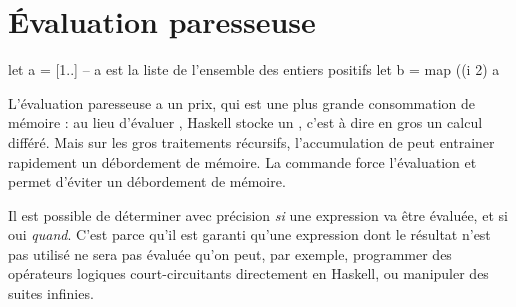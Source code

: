 \section{Évaluation paresseuse}
\label{lazyness}

\begin{haskellcode}
let a = [1..] -- a est la liste de l'ensemble des entiers positifs
let b = map ((^^) 2) a
\end{haskellcode}

L'évaluation paresseuse a un prix, qui est une plus grande consommation de mémoire : au lieu d'évaluer , Haskell stocke un , c'est à dire en gros un calcul différé. Mais sur les gros traitements récursifs, l'accumulation de  peut entrainer rapidement un débordement de mémoire. La commande  force l'évaluation et permet d'éviter un débordement de mémoire.

\begin{infobox}
Il est possible de déterminer avec précision \emph{si} une expression va être évaluée, et si oui \emph{quand}. C'est parce qu'il est garanti qu'une expression dont le résultat n'est pas utilisé ne sera pas évaluée qu'on peut, par exemple, programmer des opérateurs logiques court-circuitants directement en Haskell, ou manipuler des suites infinies.
\end{infobox}
